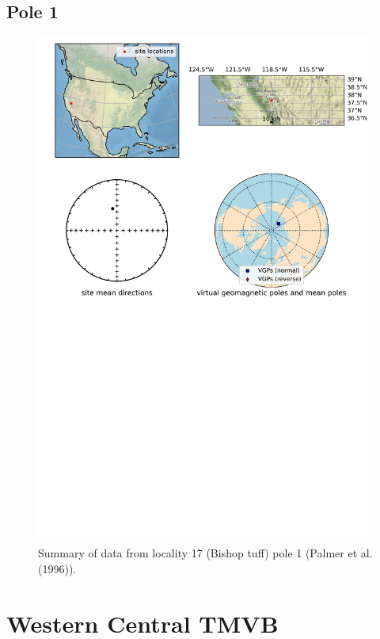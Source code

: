 \subsection{Pole 1}


\begin{figure}[H]
\centering
\includegraphics[width=5 in]{./17/1/pole_summary.png}
\caption{Summary of data from locality 17 (Bishop tuff) pole 1 (Palmer et al. (1996)).}
\end{figure}

\section{Western Central TMVB}
